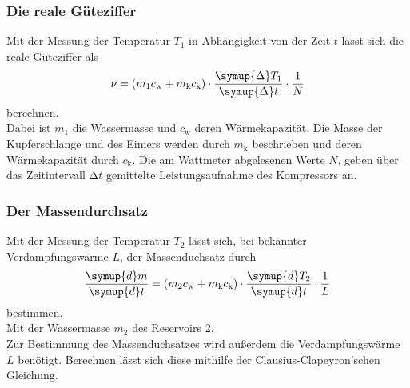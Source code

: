 \subsubsection{Die reale Güteziffer}
Mit der Messung der Temperatur $T_1$ in Abhängigkeit von der Zeit $t$ lässt sich die reale Güteziffer als 
\begin{equation}
    \nu = (m_1 c_\text{w} + m_\text{k} c_\text{k})\cdot 
    \frac{\symup{\Delta} T_1}{\symup{\Delta} t} \cdot \frac{1}{N}
    \label{eqn:Güteziffer}
\end{equation}
berechnen.\\
Dabei ist $m_1$ die Wassermasse und $c_\text{w}$ deren Wärmekapazität. Die Masse der Kupferschlange und des Eimers werden durch $m_\text{k}$ beschrieben und deren Wärmekapazität
durch $c_\text{k}$. Die am Wattmeter abgelesenen Werte $N$, geben über das Zeitintervall $\increment t$ gemittelte Leistungsaufnahme des Kompressors an.

\subsubsection{Der Massendurchsatz}
Mit der Messung der Temperatur $T_2$ lässt sich, bei bekannter Verdampfungswärme $L$, der Massenduchsatz durch\\
\begin{equation}
    \frac{\symup{d} m}{\symup{d}t} = (m_2 c_\text{w} + m_\text{k} c_\text{k}) \cdot 
    \frac{\symup{d} T_2}{\symup{d}t} \cdot  \frac{1}{L}
    \label{eqn:Massendurchsatz}
\end{equation}
bestimmen.\\
Mit der Wassermasse $m_2$ des Reservoirs 2.\\
Zur Bestimmung des Massenduchsatzes wird außerdem die Verdampfungswärme $L$ benötigt.
Berechnen lässt sich diese mithilfe der Clausius-Clapeyron'schen Gleichung.

